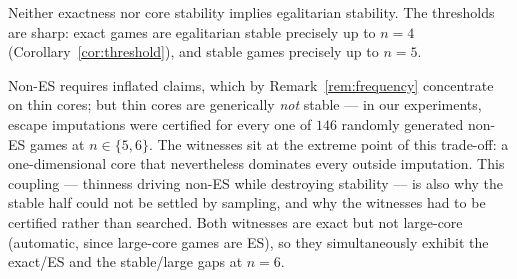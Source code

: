 \begin{corollary}\label{cor:full}
Neither exactness nor core stability implies egalitarian stability. The
thresholds are sharp: exact games are egalitarian stable precisely up to
$n=4$ (Corollary~\ref{cor:threshold}), and stable games precisely up to
$n=5$.
\end{corollary}

\begin{remark}
\label{rem:stablehard}
Non-ES requires inflated claims, which by Remark~\ref{rem:frequency}
concentrate on thin cores; but thin cores are generically \emph{not} stable
--- in our experiments, escape imputations were certified for every one of
$146$ randomly generated non-ES games at $n\in\{5,6\}$. The witnesses sit at
the extreme point of this trade-off: a one-dimensional core that nevertheless
dominates every outside imputation. This coupling --- thinness driving
non-ES while destroying stability --- is also why the stable half could not be
settled by sampling, and why the witnesses had to be certified rather than
searched. Both witnesses are exact but not large-core (automatic, since
large-core games are ES), so they simultaneously exhibit the exact/ES and the
stable/large gaps at $n=6$.
\end{remark}

